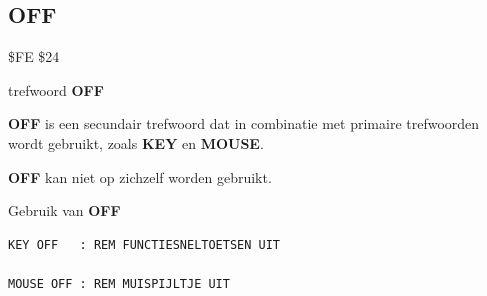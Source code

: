 
\newpage
\subsection{OFF}
\begin{description}[leftmargin=2cm,style=nextline]
\item [Token:]    \$FE \$24

\item [Formaat:]   trefwoord {\bf OFF}

\item [Gebruik:]    {\bf OFF} is een secundair trefwoord dat in combinatie met primaire trefwoorden wordt gebruikt, zoals {\bf KEY} en {\bf MOUSE}.

\item [Opmerkingen:]  {\bf OFF} kan niet op zichzelf worden gebruikt.

\item [Voorbeelden:] Gebruik van {\bf OFF}

\begin{tcolorbox}[colback=black,coltext=white]
\verbatimfont{\codefont}
\begin{verbatim}
KEY OFF   : REM FUNCTIESNELTOETSEN UIT

MOUSE OFF : REM MUISPIJLTJE UIT
\end{verbatim}
\end{tcolorbox}
\end{description}


\newpage
